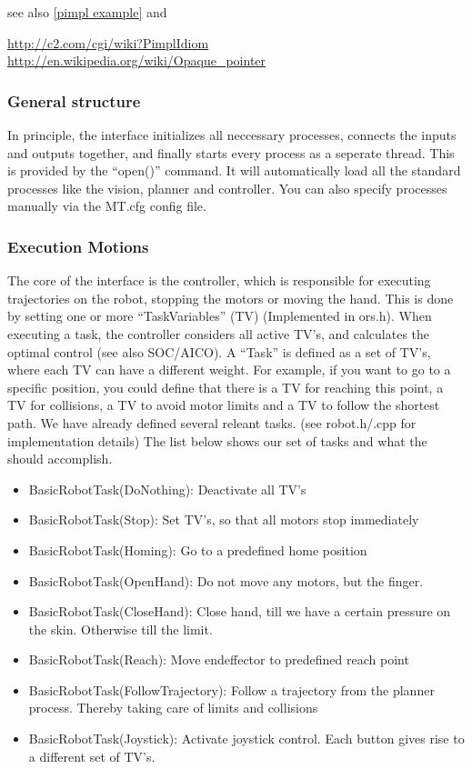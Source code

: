 see also \ref{pimpl example} and

\url{http://c2.com/cgi/wiki?PimplIdiom}\newline
\url{http://en.wikipedia.org/wiki/Opaque_pointer}
\subsubsection{General structure}
In principle, the interface initializes all neccessary processes, connects
the inputs and outputs together, and finally starts every process as a seperate
thread. This is provided by the ``open()'' command. It will automatically load
all the standard processes like the vision, planner and controller. You can also
specify processes manually via the MT.cfg config file.
\subsubsection{Execution Motions}
The core of the interface is the controller, which is responsible for
executing trajectories on the robot, stopping the motors or moving the hand.
This is done by setting one or more ``TaskVariables'' (TV) (Implemented in ors.h).
When executing a task, the controller considers all active TV's, and calculates
the optimal control (see also SOC/AICO). A ``Task'' is defined as a set of TV's,
where each TV can have a different weight. For example, if you want to go to a
specific position, you could define that there is a TV for reaching this point, a TV for collisions, a
TV to avoid motor limits and a TV to follow the shortest path. We have already
defined several releant tasks. (see robot.h/.cpp for
implementation details) The list below shows our set of tasks and what the
should accomplish.
\begin{itemize}
\item BasicRobotTask(DoNothing): Deactivate all TV's
\item BasicRobotTask(Stop): Set TV's, so that all motors stop immediately
\item BasicRobotTask(Homing): Go to a predefined home position
\item BasicRobotTask(OpenHand): Do not move any motors, but the finger.
\item BasicRobotTask(CloseHand): Close hand, till we have a certain pressure on
  the skin. Otherwise till the limit.
\item BasicRobotTask(Reach): Move endeffector to predefined reach point
\item BasicRobotTask(FollowTrajectory): Follow a trajectory from the planner
  process. Thereby taking care of limits and collisions
\item BasicRobotTask(Joystick): Activate joystick control. Each button gives
  rise to a different set of TV's.
\end{itemize}


